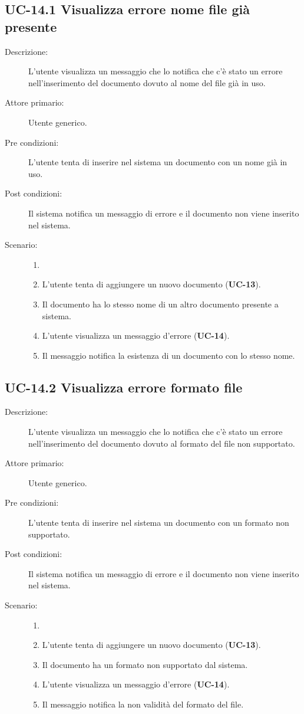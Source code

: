 \subsection{UC-14.1 Visualizza errore nome file già presente}
\begin{description}
    \item[Descrizione:] L'utente visualizza un messaggio che lo notifica che c'è stato un errore nell'inserimento del documento dovuto al nome del file già in uso.
    \item[Attore primario:] Utente generico.
    \item[Pre condizioni:] L'utente tenta di inserire nel sistema un documento con un nome già in uso.
    \item[Post condizioni:] Il sistema notifica un messaggio di errore e il documento non viene inserito nel sistema.
    \item[Scenario:]
    \begin{enumerate}
        \item[]
        \item L’utente tenta di aggiungere un nuovo documento (\textbf{UC-13}).
        \item Il documento ha lo stesso nome di un altro documento presente a sistema.
        \item L'utente visualizza un messaggio d'errore (\textbf{UC-14}).
        \item Il messaggio notifica la esistenza di un documento con lo stesso nome.
    \end{enumerate}
\end{description}

\subsection{UC-14.2 Visualizza errore formato file}
\begin{description}
    \item[Descrizione:] L'utente visualizza un messaggio che lo notifica che c'è stato un errore nell'inserimento del documento dovuto al formato del file non supportato.
    \item[Attore primario:] Utente generico.
    \item[Pre condizioni:] L'utente tenta di inserire nel sistema un documento con un formato non supportato.
    \item[Post condizioni:] Il sistema notifica un messaggio di errore e il documento non viene inserito nel sistema.
    \item[Scenario:] 
    \begin{enumerate}
        \item[]
        \item L’utente tenta di aggiungere un nuovo documento (\textbf{UC-13}).
        \item Il documento ha un formato non supportato dal sistema.
        \item L'utente visualizza un messaggio d'errore (\textbf{UC-14}).
        \item Il messaggio notifica la non validità del formato del file.
    \end{enumerate}
\end{description}

